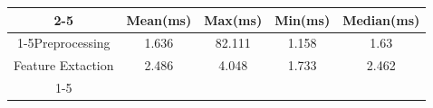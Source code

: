 \documentclass{standalone}
\begin{document}
 
 \begin{tabular}{|c |c |c |c |c |}
\cline{2-5}\cline{2-5} \multicolumn{1}{c |}{ } & Mean(ms) & Max(ms) & Min(ms) & Median(ms)\\ 
\cline{1-5}Preprocessing & 1.636 & 82.111 & 1.158 & 1.63\\ 
 \hhline{|=|=|=|=|=|}Feature Extaction & 2.486 & 4.048 & 1.733 & 2.462\\ 
 \cline{1-5}\hline \end{tabular}
 
\end{document}
